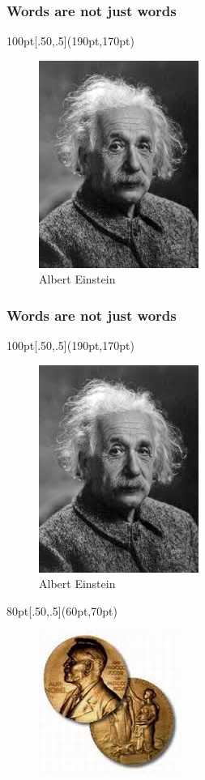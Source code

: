 \documentclass{beamer}
\begin{document}
\begin{frame}
 \frametitle{Words are not just words}
\begin{textblock*}{100pt}[.50,.5](190pt,170pt)
\begin{figure}[h]
 \centering
 \includegraphics[bb=0 0 197 256,scale=0.5]{./einstein.jpg}
  \caption{Albert Einstein}
\end{figure}
\end{textblock*}
\end{frame}
\begin{frame}
 \frametitle{Words are not just words}
\begin{textblock*}{100pt}[.50,.5](190pt,170pt)
\begin{figure}[h]
 \centering
 \includegraphics[bb=0 0 197 256,scale=0.5]{./einstein.jpg}
  \caption{Albert Einstein}
\end{figure}
\end{textblock*}
\begin{textblock*}{80pt}[.50,.5](60pt,70pt)
\begin{figure}[h]
 \centering
 \includegraphics[bb=0 0 197 256,scale=0.5]{./nobel.jpg}
\end{figure}
\end{textblock*}

\end{frame}
\end{document}
